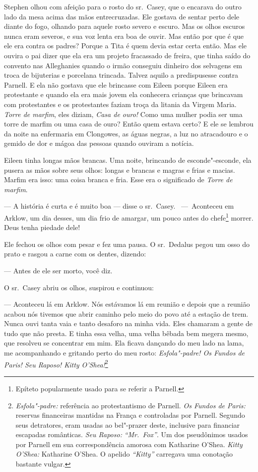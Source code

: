 Stephen olhou com afeição para o rosto do sr.~Casey, que o encarava do
outro lado da mesa acima das mãos entrecruzadas. Ele gostava de sentar
perto dele diante do fogo, olhando para aquele rosto severo e escuro.
Mas os olhos escuros nunca eram severos, e sua voz lenta era boa de
ouvir. Mas então por que é que ele era contra os padres? Porque a Tita
é quem devia estar certa então. Mas ele ouvira o pai dizer que ela era
um projeto fracassado de freira, que tinha saído do convento nas
Alleghanies quando o irmão conseguiu dinheiro dos selvagens em troca de
bijuterias e porcelana trincada. Talvez aquilo a predispusesse contra
Parnell. E ela não gostava que ele brincasse com Eileen porque Eileen
era protestante e quando ela era mais jovem ela conhecera crianças que
brincavam com protestantes e os protestantes faziam troça da litania da
Virgem Maria. \textit{Torre de marfim}, eles diziam, \textit{Casa de
ouro!} Como uma mulher podia ser uma torre de marfim ou uma casa de
ouro? Então quem estava certo? E ele se lembrou da noite na enfermaria
em Clongowes, as águas negras, a luz no atracadouro e o gemido de dor e
mágoa das pessoas quando ouviram a notícia.

Eileen tinha longas mãos brancas. Uma noite, brincando de esconde"-esconde,
ela pusera as mãos sobre seus olhos: longas e brancas e magras e frias
e macias. Marfim era isso: uma coisa branca e fria. Esse era o
significado de \textit{Torre de marfim}.

 --- A história é curta e é muito boa --- disse o sr.~Casey. \mbox{ --- Aconteceu} em Arklow, um dia desses, um dia frio de amargar, um pouco antes do
chefe\footnote{ Epíteto popularmente usado para se referir a Parnell.}
morrer. Deus tenha piedade dele!

Ele fechou os olhos com pesar e fez uma pausa. O sr.~Dedalus pegou um
osso do prato e rasgou a carne com os dentes, dizendo:

 --- Antes de ele ser morto, você diz.

O sr.~Casey abriu os olhos, suspirou e continuou:

 --- Aconteceu lá em Arklow. Nós estávamos lá em reunião e depois que a
reunião acabou nós tivemos que abrir caminho pelo meio do povo até a
estação de trem. Nunca ouvi tanta vaia e tanto desaforo na minha vida.
Eles chamaram a gente de tudo que não presta. E tinha essa velha, uma
velha bêbada bem megera mesmo, que resolveu se concentrar em mim. Ela
ficava dançando do meu lado na lama, me acompanhando e gritando perto
do meu rosto: \textit{Esfola"-padre! Os Fundos de Paris! Seu Raposo!
Kitty O’Shea!}\footnote{ \textit{Esfola"-padre:} referência ao
protestantismo de Parnell. \textit{Os Fundos de Paris:} reservas
financeiras mantidas na França e controladas por Parnell. Segundo seus
detratores, eram usadas ao bel"-prazer deste, inclusive para financiar
escapadas românticas. \textit{Seu Raposo:} \textit{“Mr.~Fox”}. Um dos
pseudônimos usados por Parnell em sua correspondência amorosa com
Katharine O’Shea. \textit{Kitty O’Shea:} Katharine O’Shea. O apelido
\textit{“Kitty”} carregava uma conotação bastante vulgar.}

